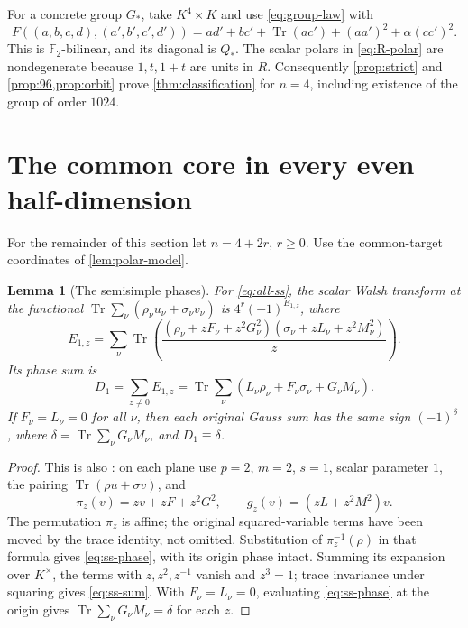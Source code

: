 \documentclass[11pt,a4paper]{article}
\newtheorem{lemma}[theorem]{Lemma}
\theoremstyle{definition}
\theoremstyle{remark}
\numberwithin{equation}{section}
\newcommand{\F}{\mathbb F}
\newcommand{\Tr}{\operatorname{Tr}}
\newcommand{\Qstar}{Q_*}
\begin{document}
For a concrete group \(G_*\), take \(K^4\times K\) and use
\eqref{eq:group-law} with
\begin{equation}\label{eq:explicit-G}
 F((a,b,c,d),(a',b',c',d'))=
 ad'+bc'+\Tr(ac')+(aa')^2+\alpha(cc')^2.
\end{equation}
This is \(\F_2\)-bilinear, and its diagonal is \(\Qstar\).
The scalar polars in \eqref{eq:R-polar} are nondegenerate because
\(1,t,1+t\) are units in \(R\).
Consequently \cref{prop:strict} and
\cref{prop:96,prop:orbit} prove \cref{thm:classification} for \(n=4\),
including existence of the group of order \(1024\).

\section{The common core in every even half-dimension}
\label{sec:classification}
For the remainder of this section let \(n=4+2r\), \(r\geq0\).
Use the common-target coordinates of \cref{lem:polar-model}.

\begin{lemma}[The semisimple phases]\label{lem:ss-phase}
For \eqref{eq:all-ss}, the scalar Walsh transform at the functional
\(\Tr\sum_\nu(\rho_\nu u_\nu+\sigma_\nu v_\nu)\) is
\(4^r(-1)^{E_{1,z}}\), where
\begin{equation}\label{eq:ss-phase}
 E_{1,z}=
 \sum_\nu\Tr\left(
 \frac{(\rho_\nu+zF_\nu+z^2G_\nu^2)
       (\sigma_\nu+zL_\nu+z^2M_\nu^2)}{z}\right).
\end{equation}
Its phase sum is
\begin{equation}\label{eq:ss-sum}
 D_1=\sum_{z\ne0}E_{1,z}
     =\Tr\sum_\nu(L_\nu\rho_\nu+F_\nu\sigma_\nu+G_\nu M_\nu).
\end{equation}
If \(F_\nu=L_\nu=0\) for all \(\nu\), then each original Gauss sum has
the same sign \((-1)^\delta\), where
\(\delta=\Tr\sum_\nu G_\nu M_\nu\), and \(D_1\equiv\delta\).
\end{lemma}
\begin{proof}
This is also \citep[equation (4), p.~313]{CMP18}: on each plane use
\(p=2\), \(m=2\), \(s=1\), scalar parameter \(1\), the pairing
\(\Tr(\rho u+\sigma v)\), and
\[
 \pi_z(v)=zv+zF+z^2G^2,\qquad
 g_z(v)=(zL+z^2M^2)v.
\]
The permutation \(\pi_z\) is affine; the original squared-variable
terms have been moved by the trace identity, not omitted.
Substitution of \(\pi_z^{-1}(\rho)\) in that formula gives
\eqref{eq:ss-phase}, with its origin phase intact.
Summing its expansion over \(K^\times\), the terms with \(z,z^2,z^{-1}\)
vanish and \(z^3=1\); trace invariance under squaring gives
\eqref{eq:ss-sum}.
With \(F_\nu=L_\nu=0\), evaluating \eqref{eq:ss-phase} at the origin
gives \(\Tr\sum_\nu G_\nu M_\nu=\delta\) for each \(z\).
\end{proof}
\end{document}
